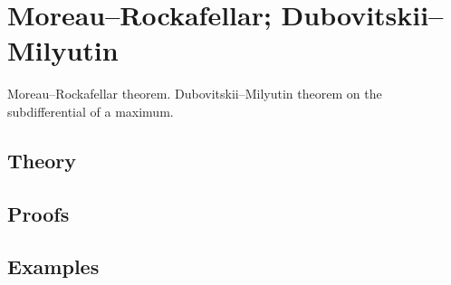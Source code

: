 
\section{Moreau–Rockafellar; Dubovitskii–Milyutin}
\label{sec:2.4.06-moreau-rockafellar}

\begin{ticket}
Moreau–Rockafellar theorem. Dubovitskii–Milyutin theorem on the subdifferential of a maximum.
\end{ticket}

\subsection*{Theory}

\subsection*{Proofs}

\subsection*{Examples}
